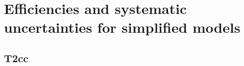 \clearpage
\section{Efficiencies and systematic uncertainties for simplified models\label{app:signal}}

\subsection{T2cc\label{app:t2cc}}

%
